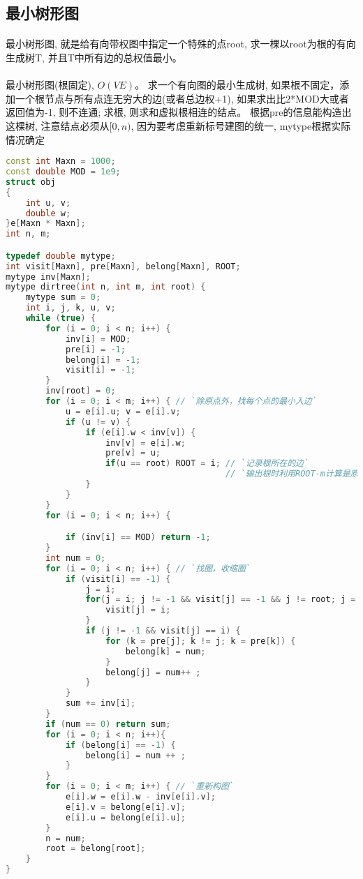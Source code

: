 ﻿\subsection{最小树形图}
	\paragraph{}
		最小树形图, 就是给有向带权图中指定一个特殊的点root, 求一棵以root为根的有向生成树T, 并且T中所有边的总权值最小。
	\paragraph{}	
	最小树形图(根固定), $ O(VE) $。
    求一个有向图的最小生成树, 如果根不固定，添加一个根节点与所有点连无穷大的边(或者总边权+1), 如果求出比2*MOD大或者返回值为-1, 则不连通; 求根, 则求和虚拟根相连的结点。
	根据pre的信息能构造出这棵树, 注意结点必须从$ [0, n) $, 因为要考虑重新标号建图的统一, mytype根据实际情况确定
\begin{lstlisting}[language=C++]
const int Maxn = 1000;
const double MOD = 1e9;
struct obj
{
    int u, v;
    double w;
}e[Maxn * Maxn];
int n, m;

typedef double mytype;
int visit[Maxn], pre[Maxn], belong[Maxn], ROOT;
mytype inv[Maxn];
mytype dirtree(int n, int m, int root) {
    mytype sum = 0;
    int i, j, k, u, v;
    while (true) {
        for (i = 0; i < n; i++) {
            inv[i] = MOD;
            pre[i] = -1;
            belong[i] = -1;
            visit[i] = -1;
        }
        inv[root] = 0;
        for (i = 0; i < m; i++) { // `除原点外，找每个点的最小入边`
            u = e[i].u; v = e[i].v;
            if (u != v) {
                if (e[i].w < inv[v]) {
                    inv[v] = e[i].w;
                    pre[v] = u;
                    if(u == root) ROOT = i; // `记录根所在的边` 
                                            // `输出根时利用ROOT-m计算是原图哪个结点`
                }
            }
        }
        for (i = 0; i < n; i++) {

            if (inv[i] == MOD) return -1;
        }
        int num = 0;
        for (i = 0; i < n; i++) { // `找圈，收缩圈`
            if (visit[i] == -1) {
                j = i;
                for(j = i; j != -1 && visit[j] == -1 && j != root; j = pre[j]) {
                    visit[j] = i;
                }
                if (j != -1 && visit[j] == i) {
                    for (k = pre[j]; k != j; k = pre[k]) {
                        belong[k] = num;
                    }
                    belong[j] = num++ ;
                }
            }
            sum += inv[i];
        }
        if (num == 0) return sum;
        for (i = 0; i < n; i++){
            if (belong[i] == -1) {
                belong[i] = num ++ ;
            }
        }
        for (i = 0; i < m; i++) { // `重新构图`
            e[i].w = e[i].w - inv[e[i].v];
            e[i].v = belong[e[i].v];
            e[i].u = belong[e[i].u];
        }
        n = num;
        root = belong[root];
    }
}
\end{lstlisting}
